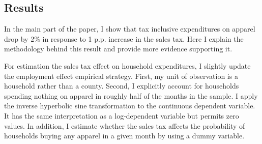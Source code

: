 \documentclass[12pt]{article}
\begin{document}
	\subsection{Results}
	
	In the main part of the paper, I show that tax inclusive expenditures on apparel drop by 2\% in response to 1 p.p. increase in the sales tax. Here I explain the methodology behind this result and provide more evidence supporting it. 
	
	For estimation the sales tax effect on household expenditures, I slightly update the employment effect empirical strategy. First, my unit of observation is a household rather than a county. Second, I explicitly account for households spending nothing on apparel in roughly half of the months in the sample. I apply the inverse hyperbolic sine transformation to the continuous dependent variable. It has the same interpretation as a log-dependent variable but permits zero values. In addition, I estimate whether the sales tax affects the probability of households buying any apparel in a given month by using a dummy variable.  
	
	
	
	
	
	
\end{document}
